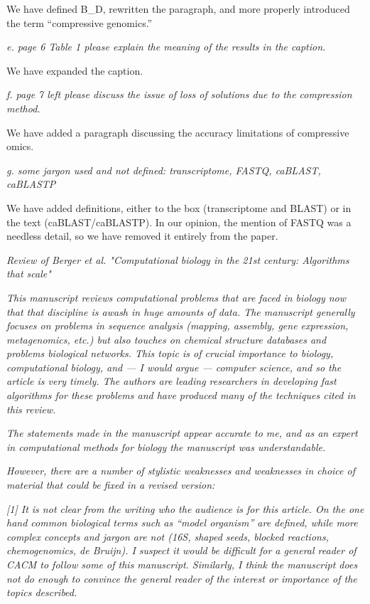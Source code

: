 \documentclass[12pt]{letter}
\begin{document}
\begin{letter}{}
We have defined B_D, rewritten the paragraph, and more properly introduced the term ``compressive genomics.''
 
\emph{e. page 6 Table 1 please explain the meaning of the results in the caption. }

We have expanded the caption.
 
\emph{f. page 7 left please discuss the issue of loss of solutions due to the compression method.}

We have added a paragraph discussing the accuracy limitations of compressive omics.
 
\emph{g. some jargon used and not defined: transcriptome, FASTQ, caBLAST, caBLASTP}

We have added definitions, either to the box (transcriptome and BLAST) or in the text (caBLAST/caBLASTP). In our opinion, the mention of FASTQ was a needless detail, so we have removed it entirely from the paper.

\emph{Review of Berger et al. "Computational biology in the 21st century: Algorithms
that scale"}

\emph{This manuscript reviews computational problems that are faced in biology now
that that discipline is awash in huge amounts of data.  The manuscript
generally focuses on problems in sequence analysis (mapping, assembly, gene
expression, metagenomics, etc.) but also touches on chemical structure
databases and problems biological networks. This topic is of crucial importance
to biology, computational biology, and --- I would argue --- computer science,
and so the article is very timely.  The authors are leading researchers in
developing fast algorithms for these problems and have produced many of the
techniques cited in this review.}

\emph{The statements made in the manuscript appear accurate to me, and as an expert
in computational methods for biology the manuscript was understandable.}

\emph{However, there are a number of stylistic weaknesses and weaknesses in choice of
material that could be fixed in a revised version:}

\emph{[1] It is not clear from the writing who the audience is for this article. On
the one hand common biological terms such as ``model organism'' are defined,
while more complex concepts and jargon are not (16S, shaped seeds, blocked
reactions, chemogenomics, de Bruijn). I suspect it would be difficult for a
general reader of CACM to follow some of this manuscript. Similarly, I think
the manuscript does not do enough to convince the general reader of the
interest or importance of the topics described.}


\end{letter}
\end{document}
